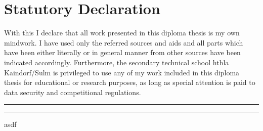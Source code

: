 \chapter*{Statutory Declaration}
With this I declare that all work presented in this diploma thesis is my own mindwork. I have used only the referred sources and aids and all parts which have been either literally or in general manner from other sources have been indicated accordingly.
\newline \newline
Furthermore, the secondary technical school \gls{htbla} Kaindorf/Sulm is privileged to use any of my work included in this diploma thesis for educational or research purposes, as long as special attention is paid to data security and competitional regulations.
\par\bigskip

\par\bigskip

\par\bigskip

\par\bigskip

\par\bigskip

\par\bigskip

\par\bigskip

\par\bigskip

\par\bigskip

\par\bigskip

\par\bigskip

\par\bigskip

\rule{6cm}{0.4pt} \space \rule{6cm}{0.4pt} 

asdf

